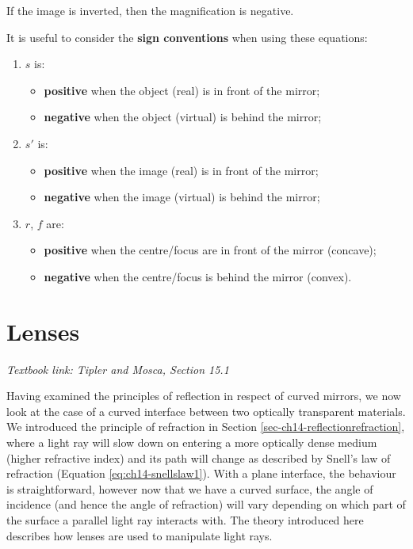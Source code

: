 \documentclass[
]{book}
\providecommand{\tightlist}{%
  \setlength{\itemsep}{0pt}\setlength{\parskip}{0pt}}
\begin{document}
If the image is inverted, then the magnification is negative.

It is useful to consider the \textbf{sign conventions} when using these equations:

\begin{enumerate}
\def\labelenumi{\arabic{enumi}.}
\tightlist
\item
  \(s\) is:

  \begin{itemize}
  \tightlist
  \item
    \textbf{positive} when the object (real) is in front of the mirror;
  \item
    \textbf{negative} when the object (virtual) is behind the mirror;
  \end{itemize}
\item
  \(s'\) is:

  \begin{itemize}
  \tightlist
  \item
    \textbf{positive} when the image (real) is in front of the mirror;
  \item
    \textbf{negative} when the image (virtual) is behind the mirror;
  \end{itemize}
\item
  \(r\), \(f\) are:

  \begin{itemize}
  \tightlist
  \item
    \textbf{positive} when the centre/focus are in front of the mirror (concave);
  \item
    \textbf{negative} when the centre/focus is behind the mirror (convex).
  \end{itemize}
\end{enumerate}

\hypertarget{sec-ch16-lenses}{%
\chapter{Lenses}\label{sec-ch16-lenses}}

\emph{Textbook link: Tipler and Mosca, Section 15.1}

Having examined the principles of reflection in respect of curved mirrors, we now look at the case of a curved interface between two optically transparent materials. We introduced the principle of refraction in Section \ref{sec-ch14-reflectionrefraction}, where a light ray will slow down on entering a more optically dense medium (higher refractive index) and its path will change as described by Snell's law of refraction (Equation \eqref{eq:ch14-snellslaw1}). With a plane interface, the behaviour is straightforward, however now that we have a curved surface, the angle of incidence (and hence the angle of refraction) will vary depending on which part of the surface a parallel light ray interacts with. The theory introduced here describes how lenses are used to manipulate light rays.
\end{document}
